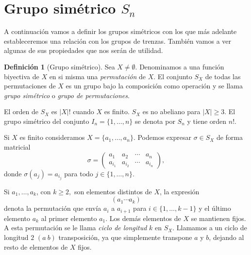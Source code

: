 \documentclass[12pt]{book}
\theoremstyle{definition}
\newtheorem{defi}{Definición}[section]
\begin{document}
\section{Grupo simétrico $S_n$}

A continuación vamos a definir los grupos simétricos con los que más adelante estableceremos una relación con los grupos de trenzas. También vamos a ver algunas de sus propiedades que nos serán de utilidad.

\begin{defi}[Grupo simétrico]
Sea $X \neq \emptyset$. Denominamos a una función biyectiva de $X$ en si misma una \textit{permutación} de $X$. El conjunto $S_X$ de todas las permutaciones de $X$ es un grupo bajo la composición como operación y se llama \textit{grupo simétrico} o \textit{grupo de permutaciones}.
\end{defi}

El orden de $S_X$ es $|X|!$ cuando $X$ es finito. $S_X$ es no abeliano para $|X|\geq 3$. El grupo simétrico del conjunto $I_n=\{1,\ldots,n\}$ se denota por $S_n$ y tiene orden $n!$.

Si $X$ es finito consideramos $X = \{a_1,\ldots,a_n\}$. Podemos expresar $\sigma\in S_X$ de forma matricial
$$\sigma = 
\begin{pmatrix}
a_1 & a_2 & \cdots & a_n\\
a_{i_1} & a_{i_2} & \cdots & a_{i_n}
\end{pmatrix}
,$$
donde $\sigma(a_j)=a_{i_j}$ para todo $j\in\{1,\ldots,n\}$.

Si $a_1,\ldots,a_k$, con $k\geq 2,$ son elementos distintos de $X$, la expresión
$$(a_1\cdots a_k)$$
denota la permutación que envía $a_i$ a $a_{i+1}$ para $i\in\{1,\ldots,k-1\}$ y el último elemento $a_k$ al primer elemento $a_1$. Los demás elementos de $X$ se mantienen fijos. A esta permutación se le llama \textit{ciclo de longitud} $k$ en $S_X$. Llamamos a un ciclo de longitud $2$ $(a\ b)$ transposición, ya que simplemente transpone $a$ y $b$, dejando al resto de elementos de $X$ fijos.
\end{document}
